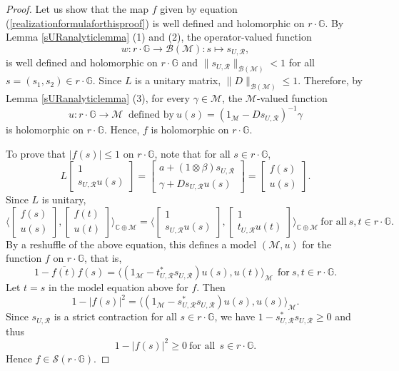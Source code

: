 \documentclass[12pt,reqno]{amsart}
\numberwithin{equation}{section}
\theoremstyle{definition}
\begin{document}
\begin{proof} Let us show that the map $f$ given by equation (\ref{realizationformulaforthisproof}) is well defined and holomorphic on  $r\cdot\mathbb{G}$.  By  Lemma \ref{sURanalyticlemma} (1) and (2),
the operator-valued function 
     $$w:r\cdot\mathbb{G}\rightarrow \mathcal{B(M)} : s\mapsto s_{U,\mathcal{R}},$$  
is well defined and holomorphic on $r\cdot\mathbb{G}$ and $\|s_{U,\mathcal{R}}\|_{\mathcal{B(M)}}< 1$ for all $s=(s_{1},s_{2})\in r\cdot\mathbb{G}$.
Since $L$ is a unitary matrix, $\|D\|_{\mathcal{B}(\mathcal{M})}\leq 1.$ Therefore, by Lemma \ref{sURanalyticlemma} (3),
for every $\gamma\in\mathcal{M}$, the $\mathcal{M}$-valued function $$u:r\cdot\mathbb{G}\rightarrow \mathcal{M} \ \text{ defined by} \ u(s) = (1_{\mathcal{M}}-Ds_{U,\mathcal{R}})^{-1}\gamma$$ is holomorphic on $r\cdot\mathbb{G}$. Hence, $f$ is holomorphic on $r\cdot\mathbb{G}$.

To prove that $\lvert f(s)\rvert \leq 1$ on $r \cdot \mathbb{G}$, note that for all $s\in r\cdot\mathbb{G}$, 
$$ L\begin{bmatrix}
    1 \\
    s_{U,\mathcal{R}}u(s)
\end{bmatrix} = \begin{bmatrix}
    a+(1\otimes\beta)s_{U,\mathcal{R}} \\
    \gamma +Ds_{U,\mathcal{R}}u(s)
\end{bmatrix}= \begin{bmatrix}
    f(s) \\
    u(s)
\end{bmatrix}.$$
Since $L$ is unitary, 
$$\bigg\langle \begin{bmatrix}
    f(s)\\
    u(s)
\end{bmatrix}, \begin{bmatrix}
    f(t)\\
    u(t)
\end{bmatrix} \bigg\rangle_{\mathbb{C}\oplus\mathcal{M}} = \bigg\langle \begin{bmatrix}
    1\\
    s_{U,\mathcal{R}}u(s)
\end{bmatrix}, \begin{bmatrix}
       1\\
    t_{U,\mathcal{R}}u(t)
\end{bmatrix} \bigg\rangle_{\mathbb{C}\oplus\mathcal{M}}~\text{for all}~s,t\in r\cdot\mathbb{G}. $$
By a reshuffle of the above equation, this defines a model $(\mathcal{M},u)$ for the function $f$ on $r\cdot\mathbb{G}$, that is, 
$$1-\overline{f(t)}f(s) = \bigg\langle(1_{\mathcal{M}}-t^{*}_{U,\mathcal{R}}s_{U,\mathcal{R}})u(s),u(t)\bigg\rangle_{\mathcal{M}}~~\text{for}~s,t\in r\cdot\mathbb{G}.$$
Let $t=s$ in the model equation above for $f$. Then
$$1-\lvert f(s) \rvert^{2} =\bigg\langle(1_{\mathcal{M}}-s^{*}_{U,\mathcal{R}}s_{U,\mathcal{R}})u(s),u(s)\bigg\rangle_{\mathcal{M}}.$$
Since $s_{U,\mathcal{R}}$ is a strict contraction for all $s\in r\cdot \mathbb{G}$, we have $1-s^{*}_{U,\mathcal{R}}s_{U,\mathcal{R}}\geq 0$ and thus
$$1-\lvert f(s) \rvert^{2} \geq 0~\text{for all}~~s\in r\cdot \mathbb{G}.$$
Hence $f\in\mathcal{S}(r\cdot\mathbb{G})$.\end{proof}
\end{document}
